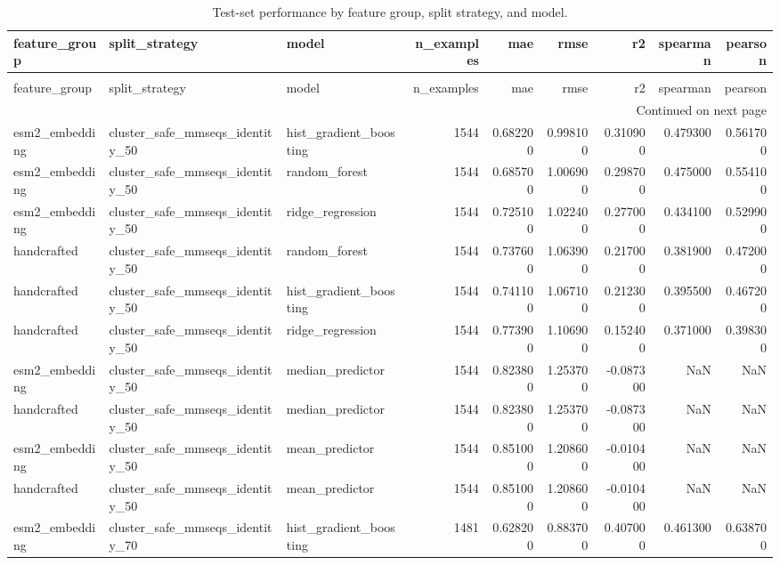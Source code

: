 \begin{longtable}{lllrrrrrr}
\caption{Test-set performance by feature group, split strategy, and model.} \label{tab:model-comparison} \\
\toprule
feature\_group & split\_strategy & model & n\_examples & mae & rmse & r2 & spearman & pearson \\
\midrule
\endfirsthead
\caption[]{Test-set performance by feature group, split strategy, and model.} \\
\toprule
feature\_group & split\_strategy & model & n\_examples & mae & rmse & r2 & spearman & pearson \\
\midrule
\endhead
\midrule
\multicolumn{9}{r}{Continued on next page} \\
\midrule
\endfoot
\bottomrule
\endlastfoot
esm2\_embedding & cluster\_safe\_mmseqs\_identity\_50 & hist\_gradient\_boosting & 1544 & 0.682200 & 0.998100 & 0.310900 & 0.479300 & 0.561700 \\
esm2\_embedding & cluster\_safe\_mmseqs\_identity\_50 & random\_forest & 1544 & 0.685700 & 1.006900 & 0.298700 & 0.475000 & 0.554100 \\
esm2\_embedding & cluster\_safe\_mmseqs\_identity\_50 & ridge\_regression & 1544 & 0.725100 & 1.022400 & 0.277000 & 0.434100 & 0.529900 \\
handcrafted & cluster\_safe\_mmseqs\_identity\_50 & random\_forest & 1544 & 0.737600 & 1.063900 & 0.217000 & 0.381900 & 0.472000 \\
handcrafted & cluster\_safe\_mmseqs\_identity\_50 & hist\_gradient\_boosting & 1544 & 0.741100 & 1.067100 & 0.212300 & 0.395500 & 0.467200 \\
handcrafted & cluster\_safe\_mmseqs\_identity\_50 & ridge\_regression & 1544 & 0.773900 & 1.106900 & 0.152400 & 0.371000 & 0.398300 \\
esm2\_embedding & cluster\_safe\_mmseqs\_identity\_50 & median\_predictor & 1544 & 0.823800 & 1.253700 & -0.087300 & NaN & NaN \\
handcrafted & cluster\_safe\_mmseqs\_identity\_50 & median\_predictor & 1544 & 0.823800 & 1.253700 & -0.087300 & NaN & NaN \\
esm2\_embedding & cluster\_safe\_mmseqs\_identity\_50 & mean\_predictor & 1544 & 0.851000 & 1.208600 & -0.010400 & NaN & NaN \\
handcrafted & cluster\_safe\_mmseqs\_identity\_50 & mean\_predictor & 1544 & 0.851000 & 1.208600 & -0.010400 & NaN & NaN \\
esm2\_embedding & cluster\_safe\_mmseqs\_identity\_70 & hist\_gradient\_boosting & 1481 & 0.628200 & 0.883700 & 0.407000 & 0.461300 & 0.638700 \\

\end{longtable}
